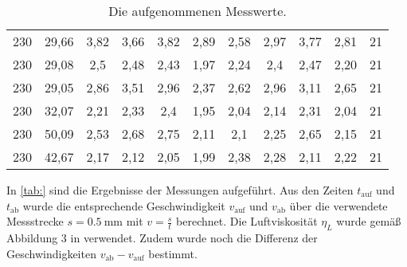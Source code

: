 \begin{table}[!ht]
\begin{tabular}{c c c c c c c c c c c}
                    230 & 29,66 &                      3,82 &                      3,66 &                      3,82 &                2,89 &                2,58 &                2,97 &                                               3,77 &       2,81 &                 21 \\
                    230 & 29,08 &                       2,5 &                      2,48 &                      2,43 &                1,97 &                2,24 &                 2,4 &                                               2,47 &       2,20 &                 21 \\
                    230 & 29,05 &                      2,86 &                      3,51 &                      2,96 &                2,37 &                2,62 &                2,96 &                                               3,11 &       2,65 &                 21 \\
                    230 & 32,07 &                      2,21 &                      2,33 &                       2,4 &                1,95 &                2,04 &                2,14 &                                               2,31 &       2,04 &                 21 \\
                    230 & 50,09 &                      2,53 &                      2,68 &                      2,75 &                2,11 &                 2,1 &                2,25 &                                               2,65 &       2,15 &                 21 \\
                    230 & 42,67 &                      2,17 &                      2,12 &                      2,05 &                1,99 &                2,38 &                2,28 &                                               2,11 &       2,22 &                 21 \\
        \bottomrule
        \end{tabular}
        \caption{Die aufgenommenen Messwerte.}
        \label{tab:Messwerte}
    \end{table}


In \ref{tab:} sind die Ergebnisse der Messungen aufgeführt. Aus den Zeiten $t_{\text{auf}}$ und $t_{\text{ab}}$ 
wurde die entsprechende Geschwindigkeit $v_{\text{auf}}$ und $v_{\text{ab}}$ über die verwendete Messstrecke $s = \SI{0.5}{\mm}$
mit $v=\frac{s}{t}$ berechnet. Die Luftviskosität $\eta_{L}$ wurde gemäß Abbildung 3 in \cite{1} verwendet. Zudem wurde noch die  
Differenz der Geschwindigkeiten $v_{\text{ab}} - v_{\text{auf}}$ bestimmt.

